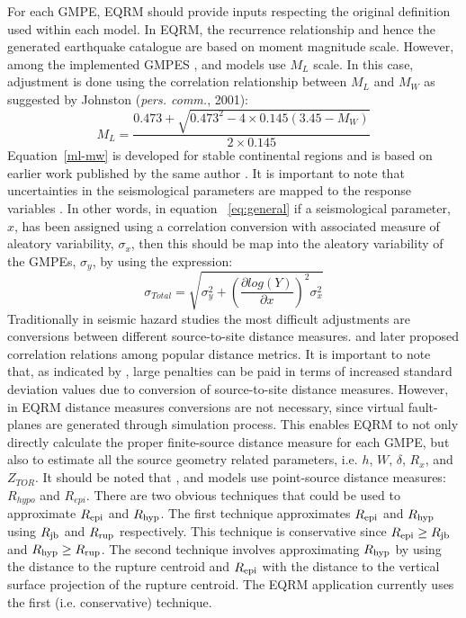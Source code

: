 For each GMPE, EQRM should provide inputs respecting the original
definition used within each model. In EQRM, the recurrence
relationship and hence the generated earthquake catalogue are based
on moment magnitude scale. However, among the implemented GMPES
\citet{eqrm_Gaull90a}, and \citet{eqrm_Liang08} models use $M_L$
scale. In this case, adjustment is done using the correlation
relationship between $M_L$ and $M_W$ as suggested by Johnston
(\textit{pers. comm.}, 2001):
\begin{equation}\label{ml-mw}
M_L =
\frac{0.473+\sqrt{0.473^2-4\times0.145(3.45-M_W)}}{2\times0.145}
\end{equation}
Equation~\ref{ml-mw} is developed for stable continental regions and
is based on earlier work published by the same author
\citep{eqrm_Johnstone96a}. It is important to note that
uncertainties in the seismological parameters are mapped to the
response variables \citep{eqrm_Bommer05}. In other words, in
equation ~\ref{eq:general} if a seismological parameter, $x$, has
been assigned using a correlation conversion with associated measure
of aleatory variability, $\sigma_x$, then this should be map into
the aleatory variability of the GMPEs, $\sigma_y$, by using the
expression:
\begin{equation}
\sigma_{Total} = \sqrt{\sigma_y^2+(\dfrac{\partial log(Y)}{\partial
x})^2 \sigma_x^2}
\end{equation}
Traditionally in seismic hazard studies the most difficult
adjustments are conversions between different source-to-site
distance measures. \citet{eqrm_Scherbaum04b} and later
\citet{eqrm_Kak11} proposed correlation relations among popular
distance metrics. It is important to note that, as indicated by
\citet{eqrm_Scherbaum05}, large penalties can be paid in terms of
increased standard deviation values due to conversion of
source-to-site distance measures. However, in EQRM distance measures
conversions are not necessary, since virtual fault-planes are
generated through simulation process. This enables EQRM to not only
directly calculate the proper finite-source distance measure for
each GMPE, but also to estimate all the source geometry related
parameters, i.e. $h$, $W$, $\delta$, $R_x$, and $Z_{TOR}$. It should
be noted that \citet{eqrm_Gaull90a}, and \citet{eqrm_Liang08} models
use point-source distance measures: $R_{hypo}$ and $R_{epi}$. There
are two obvious techniques that could be used to approximate $\Repi$
and $\Rhyp$. The first technique approximates $\Repi$ and $\Rhyp$
using $\Rjb$ and $\Rrup$ respectively. This technique is
conservative since \mbox{$\Repi \geq \Rjb$} and \mbox{$\Rhyp \geq
\Rrup$}. The second technique involves approximating $\Rhyp$ by
using the distance to the rupture centroid and $\Repi$ with the
distance to the vertical surface projection of the rupture centroid.
The EQRM application currently uses the first (i.e. conservative)
technique.

